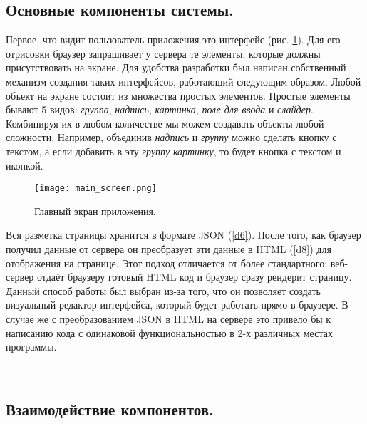 \subsection{Основные компоненты системы.}

Первое, что видит пользователь приложения это интерфейс (рис. \ref{fig:main_screen}). Для его отрисовки браузер запрашивает
у сервера те элементы, которые должны присутствовать на экране. Для удобства разработки был написан собственный механизм
создания таких интерфейсов, работающий следующим образом. Любой объект на экране состоит из множества простых элементов.
Простые элементы бывают 5 видов: \textit{группа}, \textit{надпись}, \textit{картинка}, \textit{поле для ввода} и
\textit{слайдер}. Комбинируя их в любом количестве мы можем создавать объекты любой сложности. Например, объединив
\textit{надпись} и \textit{группу} можно сделать кнопку с текстом, а если добавить в эту \textit{группу} \textit{картинку},
то будет кнопка с текстом и иконкой.

\begin{figure}[h]
    \centering
    \texttt{[image: main\_screen.png]}
    \caption{Главный экран приложения.}
    \label{fig:main_screen}
\end{figure}

\noindent Вся разметка страницы хранится в формате JSON (\ref{d6}). После того, как браузер получил данные от сервера он
преобразует эти данные в HTML (\ref{d8}) для отображения на странице. Этот подход отличается от более стандартного:
веб-сервер отдаёт браузеру готовый HTML код и браузер сразу рендерит страницу. Данный способ работы был выбран из-за того,
что он позволяет создать визуальный редактор интерфейса, который будет работать прямо в браузере. В случае же с
преобразованием JSON в HTML на сервере это привело бы к написанию кода с одинаковой функциональностью в 2-х различных
местах программы.

~\


\subsection{Взаимодействие компонентов.}


